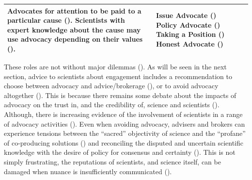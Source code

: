 \begin{table}[!ht]
\begin{tabular}{L{.48\linewidth}L{.30\linewidth}L{.22\linewidth}}
Advocates for attention to be paid to a particular cause (\cite{KarkkainenLKK2024}). Scientists with expert knowledge about the cause may use advocacy depending on their values (\cite{RykielEtAl2002,RapleyD2014,ElsensohnACDGGKPRS2019}).  & Issue Advocate (\cite{Pielke2007}) Policy Advocate (\cite{ScottRLPAFSRSS2007}) Taking a Position (\cite{SteelLLS2004}) Honest Advocate (\cite{RoseBOP2018,GregoryBW2024}) %
& \textcite{SteelLLS2004,ScottRLPAFSRSS2007,SinghTKMMC2014,RoseBOP2018,DablanderSCSBGGBAH2024} \\ \hline
\end{tabular}
\end{table}

These roles are not without major dilemmas (\cite{NelsonV2009,CairneyO2020}). As will be seen in the next section, advice to scientists about \SPI{} engagement includes a recommendation to choose between advocacy and advice/brokerage (\cite{OliverC2019}), or to avoid advocacy altogether (\cite{Lackey2007,Gluckman2014}). This is because there remains some debate about the impacts of advocacy on the trust in, and the credibility of, science and scientists (\cite{Edwards2013,GregoryBW2024,ColognaKMBMO2024,DablanderSCSBGGBAH2024,RykielEtAl2002}). Although, there is increasing evidence of the involvement of \CAN{} scientists in a range of advocacy activities (\cite{ColognaKMBMO2024,DablanderSCSBGGBAH2024,ScottRLPAFSRSS2007}). Even when avoiding advocacy, advisers and brokers can experience tensions between the ``sacred'' objectivity of science and the ``profane'' of co-producing solutions (\cite{WesselinkH2020,MacKillopCDD2023}) and reconciling the disputed and uncertain scientific knowledge with the desire of policy for consensus and certainty (\cite{Stirling2010,Hicks2024}). This is not simply frustrating, the reputations of scientists, and science itself, can be damaged when nuance is insufficiently communicated (\cite{Stirling2010,OjanenBKP2021}).

